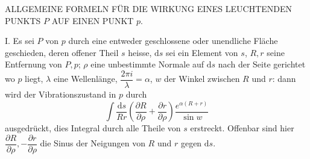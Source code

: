 \begin{center}ALLGEMEINE FORMELN FÜR DIE WIRKUNG EINES LEUCHTENDEN PUNKTS $P$ AUF EINEN PUNKT $p$.\end{center}
I. Es sei $P$ von $p$ durch eine entweder geschlossene oder unendliche Fläche geschieden, deren offener Theil $s$ heisse, $\mathrm ds$ sei ein Element von $s$, $R,r$ seine Entfernung von $P,p$; $\rho$ eine unbestimmte Normale auf $\mathrm ds$ nach der Seite gerichtet wo $p$ liegt, $\lambda$ eine Wellenlänge, $\dfrac{2\pi i}{\lambda}=\alpha$, $w$ der Winkel zwischen $R$ und $r$: dann wird der Vibrationszustand in $p$ durch
\[
\int\frac{\mathrm ds}{Rr}\left(\frac{\partial R}{\partial\rho}+\frac{\partial r}{\partial\rho}\right)\frac{e^{\alpha(R+r)}}{\sin w}
\]
ausgedrückt, dies Integral durch alle Theile von $s$ erstreckt. Offenbar sind hier $\dfrac{\partial R}{\partial\rho},-\dfrac{\partial r}{\partial\rho}$ die Sinus der Neigungen von $R$ und $r$ gegen $\mathrm ds$.
